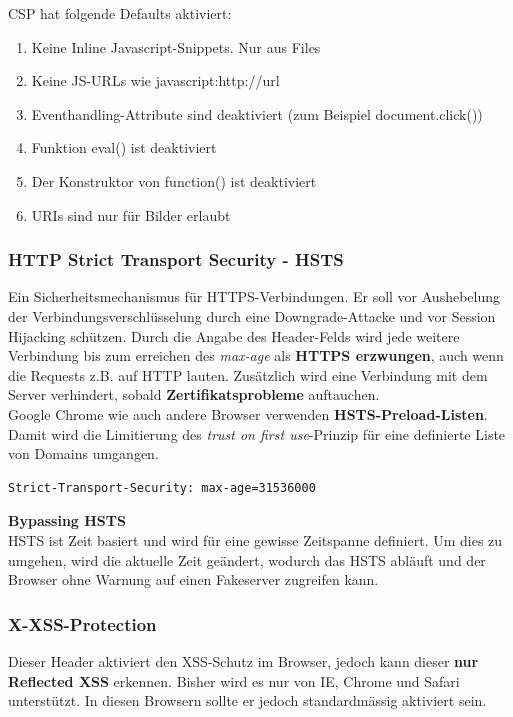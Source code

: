 CSP hat folgende Defaults aktiviert:
\begin{enumerate}
	\item Keine Inline Javascript-Snippets. Nur aus Files 
	\item Keine JS-URLs wie javascript:http://url
	\item Eventhandling-Attribute sind deaktiviert (zum Beispiel document.click())
	\item Funktion eval() ist deaktiviert
	\item Der Konstruktor von function() ist deaktiviert
	\item URIs sind nur für Bilder erlaubt
\end{enumerate}

\subsubsection{HTTP Strict Transport Security - HSTS}
Ein Sicherheitsmechanismus für HTTPS-Verbindungen. Er soll vor Aushebelung der Verbindungsverschlüsselung durch eine Downgrade-Attacke und vor Session Hijacking schützen. Durch die Angabe des Header-Felds wird jede weitere Verbindung bis zum erreichen des \textit{max-age} als \textbf{HTTPS erzwungen}, auch wenn die Requests z.B. auf HTTP lauten. Zusätzlich wird eine Verbindung mit dem Server verhindert, sobald \textbf{Zertifikatsprobleme} auftauchen.\\

Google Chrome wie auch andere Browser verwenden \textbf{HSTS-Preload-Listen}. Damit wird die Limitierung des \textit{trust on first use}-Prinzip für eine definierte Liste von Domains umgangen.

\begin{lstlisting}[language={},caption=HSTS-Header]
Strict-Transport-Security: max-age=31536000
\end{lstlisting}

\textbf{Bypassing HSTS}\\
HSTS ist Zeit basiert und wird für eine gewisse Zeitspanne definiert. Um dies zu umgehen, wird die aktuelle Zeit geändert, wodurch das HSTS abläuft und der Browser ohne Warnung auf einen Fakeserver zugreifen kann.

\subsubsection{X-XSS-Protection}
Dieser Header aktiviert den XSS-Schutz im Browser, jedoch kann dieser \textbf{nur Reflected XSS} erkennen. Bisher wird es nur von IE, Chrome und Safari unterstützt. In diesen Browsern sollte er jedoch standardmässig aktiviert sein.


